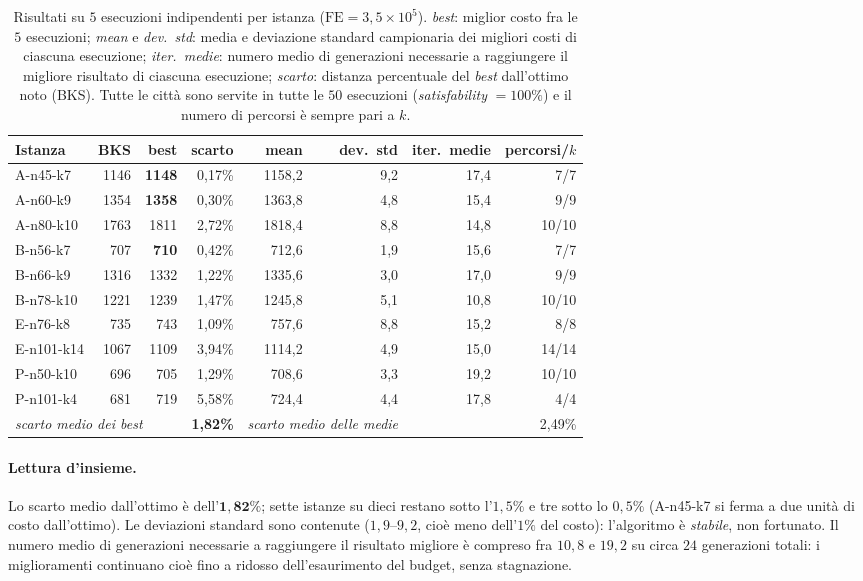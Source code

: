 \documentclass[10pt,a4paper]{article}
\begin{document}
\begin{table}[H]
\centering
\small
\caption{Risultati su $5$ esecuzioni indipendenti per istanza
($\mathrm{FE}=3{,}5\times10^5$). \emph{best}: miglior costo fra le $5$ esecuzioni;
\emph{mean} e \emph{dev.\ std}: media e deviazione standard campionaria dei
migliori costi di ciascuna esecuzione; \emph{iter.\ medie}: numero medio di
generazioni necessarie a raggiungere il migliore risultato di ciascuna esecuzione;
\emph{scarto}: distanza percentuale del \emph{best} dall'ottimo noto (BKS).
Tutte le città sono servite in tutte le $50$ esecuzioni (\emph{satisfability}
$=100\%$) e il numero di percorsi è sempre pari a $k$.}
\label{tab:risultati}
\begin{tabular}{lrrrrrrr}
\toprule
Istanza & BKS & best & scarto & mean & dev.\ std & iter.\ medie & percorsi/$k$ \\
\midrule
A-n45-k7   & 1146 & \textbf{1148} & 0,17\% & 1158,2 & 9,2 & 17,4 & 7/7 \\
A-n60-k9   & 1354 & \textbf{1358} & 0,30\% & 1363,8 & 4,8 & 15,4 & 9/9 \\
A-n80-k10  & 1763 & 1811 & 2,72\% & 1818,4 & 8,8 & 14,8 & 10/10 \\
B-n56-k7   & 707  & \textbf{710}  & 0,42\% & 712,6  & 1,9 & 15,6 & 7/7 \\
B-n66-k9   & 1316 & 1332 & 1,22\% & 1335,6 & 3,0 & 17,0 & 9/9 \\
B-n78-k10  & 1221 & 1239 & 1,47\% & 1245,8 & 5,1 & 10,8 & 10/10 \\
E-n76-k8   & 735  & 743  & 1,09\% & 757,6  & 8,8 & 15,2 & 8/8 \\
E-n101-k14 & 1067 & 1109 & 3,94\% & 1114,2 & 4,9 & 15,0 & 14/14 \\
P-n50-k10  & 696  & 705  & 1,29\% & 708,6  & 3,3 & 19,2 & 10/10 \\
P-n101-k4  & 681  & 719  & 5,58\% & 724,4  & 4,4 & 17,8 & 4/4 \\
\midrule
\multicolumn{3}{l}{\emph{scarto medio dei best}} & \textbf{1,82\%} &
\multicolumn{2}{l}{\emph{scarto medio delle medie}} & \multicolumn{2}{r}{2,49\%} \\
\bottomrule
\end{tabular}
\end{table}

\paragraph{Lettura d'insieme.} Lo scarto medio dall'ottimo è dell'$\mathbf{1{,}82\%}$;
sette istanze su dieci restano sotto l'$1{,}5\%$ e tre sotto lo $0{,}5\%$
(A-n45-k7 si ferma a due unità di costo dall'ottimo). Le deviazioni standard sono
contenute ($1{,}9$--$9{,}2$, cioè meno dell'$1\%$ del costo): l'algoritmo è
\emph{stabile}, non fortunato. Il numero medio di generazioni necessarie a
raggiungere il risultato migliore è compreso fra $10{,}8$ e $19{,}2$ su circa
$24$ generazioni totali: i miglioramenti continuano cioè fino a ridosso
dell'esaurimento del budget, senza stagnazione.
\end{document}
